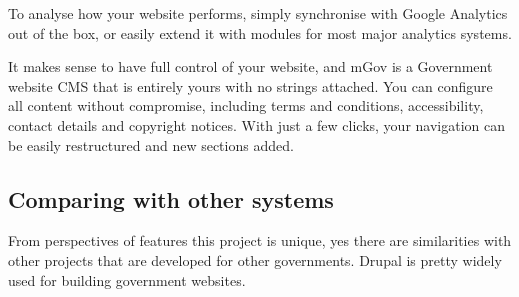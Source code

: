 To analyse how your website performs, simply synchronise with Google Analytics out of the box, or easily extend it with modules for most major analytics systems.

It makes sense to have full control of your website, and mGov is a Government website CMS that is entirely yours with no strings attached. You can configure all content without compromise, including terms and conditions, accessibility, contact details and copyright notices. With just a few clicks, your navigation can be easily restructured and new sections added.

\subsection{Comparing with other systems}
From perspectives of features this project is unique, yes there are similarities with other projects that are developed for other governments. Drupal is pretty widely used for building government websites.
